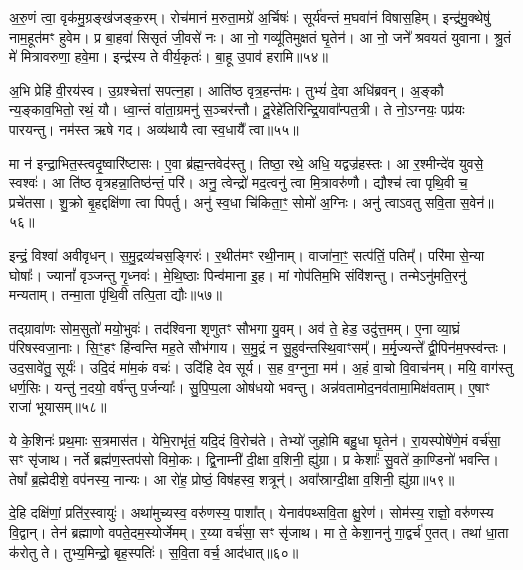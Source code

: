 अ॒रु॒णं त्वा॒ वृक॑मु॒ग्रङ्ख॑जङ्क॒रम्।
रोच॑मानं म॒रुता॒मग्रे॑ अ॒र्चिषः॑।
सूर्य॑वन्तं म॒घवा॑नं विषास॒हिम्।
इन्द्र॑मु॒क्थेषु॑ नाम॒हूत॑मꣳ हुवेम।
प्र बा॒हवा॑ सिसृतं जी॒वसे॑ नः।
आ नो॒ गव्यू॑तिमुक्षतं घृ॒तेन॑।
आ नो॒ जने᳚ श्रवयतं युवाना।
श्रु॒तं मे॑ मित्रावरुणा॒ हवे॒मा।
इन्द्र॑स्य ते वीर्य॒कृतः॑।
बा॒हू उ॒पाव॑ हरामि॥५४॥\ip\anuvakamend[ब॒भू॒वाव्य॑य॒त्तेने॒मम॑ग्न इ॒ह वर्च॑सा॒ सम॑ङ्ग्धि॒ वैया॒घ्रेऽधि॑ राष्ट्र॒वर्ध॑नः॒ पाङ्क्ते॑न॒ छन्द॑सो॒पाव॑हरामि]

अ॒भि प्रेहि॑ वी॒रय॑स्व।
उ॒ग्रश्चेत्ता॑ सपत्न॒हा।
आति॑ष्ठ वृत्र॒हन्त॑मः।
तुभ्यं॑ दे॒वा अधि॑ब्रवन्।
अ॒ङ्कौ न्य॒ङ्काव॒भितो॒ रथं॒ यौ।
ध्वा॒न्तं वा॑ता॒ग्रमनु॑ स॒ञ्चर॑न्तौ।
दू॒रेहे॑तिरिन्द्रि॒यावा᳚न्पत॒त्री।
ते नो॒\-ऽग्नयः॒ पप्र॑यः पारयन्तु।
नम॑स्त ऋषे गद।
अव्य॑थायै त्वा स्व॒धायै᳚ त्वा॥५५॥\ip

मा न॑ इन्द्रा॒भित॒स्त्वदृ॒ष्वारि॑ष्टासः।
ए॒वा ब्र॑ह्म॒न्तवेद॑स्तु।
तिष्ठा॒ रथे॒ अधि॒ यद्वज्र॑हस्तः।
आ र॒श्मीन्दे॑व युवसे॒ स्वश्वः॑।
आ ति॑ष्ठ वृत्रहन्ना॒तिष्ठ॑न्तं॒ परि॑।
अनु॒ त्वेन्द्रो॑ मद॒त्वनु॑ त्वा मि॒त्रावरु॑णौ।
द्यौश्च॑ त्वा पृथि॒वी च॒ प्रचे॑तसा।
शु॒क्रो बृ॒हद्दक्षि॑णा त्वा पिपर्तु।
अनु॑ स्व॒धा चि॑किता॒ꣳ॒ सोमो॑ अ॒ग्निः।
अनु॑ त्वाऽवतु सवि॒ता स॒वेन॑॥५६॥\ip

इन्द्रं॒ विश्वा॑ अवीवृधन्।
स॒मु॒द्रव्य॑चस॒ङ्गिरः॑।
र॒थीत॑मꣳ रथी॒नाम्।
वाजा॑ना॒ꣳ॒ सत्प॑तिं॒ पतिम्᳚।
परि॑मा से॒न्या घोषाः᳚।
ज्यानां᳚ वृञ्जन्तु गृ॒ध्नवः॑।
मे॒थि॒ष्ठाः पिन्व॑माना इ॒ह।
मां गोप॑तिम॒भि संवि॑शन्तु।
तन्मे\-ऽनु॑मति॒रनु॑\- मन्यताम्।
तन्मा॒ता पृ॑थि॒वी तत्पि॒ता द्यौः॥५७॥\ip

तद्ग्रावा॑णः सोम॒सुतो॑ मयो॒भुवः॑।
तद॑श्विना शृणुतꣳ सौभगा यु॒वम्।
अव॑ ते॒ हेड॒ उदु॑त्त॒मम्।
ए॒ना व्या॒घ्रं प॑रिषस्वजा॒नाः।
सि॒ꣳ॒हꣳ हि॑न्वन्ति मह॒ते सौभ॑गाय।
स॒मु॒द्रं न सु॒हुव॑न्तस्थि॒वाꣳसम्᳚।
म॒र्मृ॒ज्यन्ते᳚ द्वी॒पिन॑म॒फ्स्व॑न्तः।
उद॒सावे॑तु॒ सूर्यः॑।
उदि॒दं मा॑म॒कं वचः॑।
उदि॑हि देव सूर्य।
स॒ह व॒ग्नुना॒ मम॑।
अ॒हं वा॒चो वि॒वाच॑नम्।
मयि॒ वाग॑स्तु धर्ण॒सिः।
यन्तु॑ न॒दयो॒ वर्\mbox{}ष॑न्तु प॒र्जन्याः᳚।
सु॒पि॒प्प॒ला ओष॑धयो भवन्तु।
अन्न॑वतामोद॒नव॑तामा॒मिक्ष॑वताम्।
ए॒षाꣳ राजा॑ भूयासम्॥५८॥\ip\anuvakamend[स्व॒धायै᳚ त्वा स॒वेन॒ द्यौः सू᳚र्य स॒प्त च॑]

ये के॒शिनः॑ प्रथ॒माः स॒त्रमास॑त।
येभि॒राभृ॑तं॒ यदि॒दं वि॒रोच॑ते।
तेभ्यो॑ जुहोमि बहु॒धा घृ॒तेन॑।
रा॒यस्पोषे॑णे॒मं वर्च॑सा॒ सꣳ सृ॑जाथ।
नर्ते ब्रह्म॑ण॒स्तप॑सो विमो॒कः।
द्वि॒नाम्नी॑ दी॒क्षा व॒शिनी॒ ह्यु॑ग्रा।
प्र केशाः᳚ सु॒वते॑ का॒ण्डिनो॑ भवन्ति।
तेषां᳚ ब्र॒ह्मेदीशे॒ वप॑नस्य॒ नान्यः।
आ रो॑ह॒ प्रोष्ठं॒ विष॑हस्व॒ शत्रून्॑।
अवा᳚स्राग्दी॒क्षा व॒शिनी॒ ह्यु॑ग्रा॥५९॥\ip

दे॒हि दक्षि॑णां॒ प्रति॑\-र॒स्वायुः॑।
अथा॑मुच्यस्व॒ वरु॑णस्य॒ पाशा᳚त्।
येनाव॑पथ्सवि॒ता क्षु॒रेण॑।
सोम॑स्य॒ राज्ञो॒ वरु॑णस्य वि॒द्वान्।
तेन॑ ब्रह्माणो वपते॒दम॒स्योर्जेमम्।
र॒य्या वर्च॑सा॒ सꣳ सृ॑जाथ।
मा ते॒ केशा॒ननु॑ गा॒द्वर्च॑ ए॒तत्।
तथा॑ धा॒ता क॑रोतु ते।
तुभ्य॒मिन्द्रो॒ बृह॒स्पतिः॑।
स॒वि॒ता वर्च॒ आद॑धात्॥६०॥\ip


